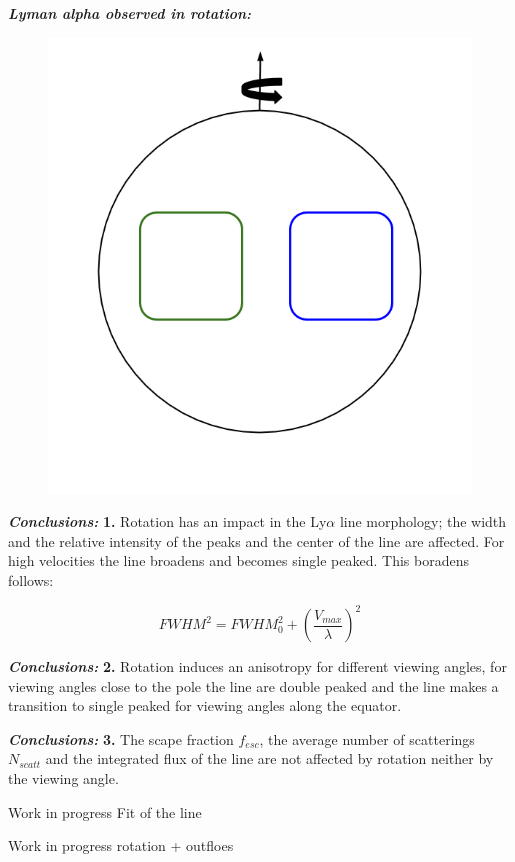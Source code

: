 \documentclass{beamer}
\begin{document}
\begin{frame}{\textit{\textbf{Lyman alpha observed in rotation:}}}
\begin{figure}
\includegraphics[scale=0.2]{Figures/measure.png}
\end{figure}
\end{frame}

\begin{frame}{\textit{\textbf{Conclusions:}}}
\textbf{1.} Rotation has an impact in the Ly$\alpha$ line morphology; the width and the relative intensity 
of the peaks and the center of the line are affected.  For high velocities the line broadens and
becomes single peaked. This boradens follows:

\[
FWHM^2 = FWHM_0^2 + \left( \dfrac{V_{max}}{\lambda} \right )^2
\]
\end{frame}

\begin{frame}{\textit{\textbf{Conclusions:}}}
\textbf{2.} Rotation induces an anisotropy for different viewing angles, for viewing angles close to the 
pole the line are double peaked and the line makes a transition to single peaked for viewing 
angles along the equator.
\end{frame}


\begin{frame}{\textit{\textbf{Conclusions:}}}
\textbf{3.} The scape fraction $f_{esc}$, the average number of scatterings $N_{scatt}$ 
and the integrated flux of the line are not affected by rotation neither by the viewing angle.
\end{frame}

\begin{frame}{Work in progress}
Fit of the line
\end{frame}

\begin{frame}{Work in progress}
rotation + outfloes
\end{frame}
\end{document}
